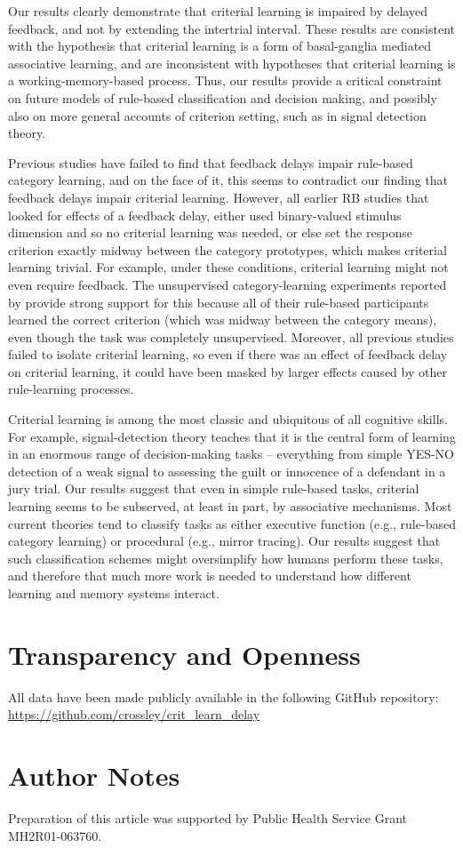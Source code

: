 \documentclass[doc, floatsintext]{apa7}
\begin{document}
Our results clearly demonstrate that criterial learning is
impaired by delayed feedback, and not by extending the
intertrial interval. These results are consistent with the
hypothesis that criterial learning is a form of
basal-ganglia mediated associative learning, and are
inconsistent with hypotheses that criterial learning is a
working-memory-based process. Thus, our results provide a
critical constraint on future models of rule-based
classification and decision making, and possibly also on
more general accounts of criterion setting, such as in
signal detection theory.

Previous studies have failed to find that feedback delays
impair rule-based category learning, and on the face of it,
this seems to contradict our finding that feedback delays
impair criterial learning. However, all earlier RB studies
that looked for effects of a feedback delay, either used
binary-valued stimulus dimension and so no criterial
learning was needed, or else set the response criterion
exactly midway between the category prototypes, which makes
criterial learning trivial. For example, under these
conditions, criterial learning might not even require
feedback. The unsupervised category-learning experiments
reported by \textcite{ashby1999dominance} provide strong
support for this because all of their rule-based
participants learned the correct criterion (which was midway
between the category means), even though the task was
completely unsupervised. Moreover, all previous studies
failed to isolate criterial learning, so even if there was
an effect of feedback delay on criterial learning, it could
have been masked by larger effects caused by other
rule-learning processes.

Criterial learning is among the most classic and ubiquitous
of all cognitive skills. For example, signal-detection
theory teaches that it is the central form of learning in an
enormous range of decision-making tasks -- everything from
simple YES-NO detection of a weak signal to assessing the
guilt or innocence of a defendant in a jury trial. Our
results suggest that even in simple rule-based tasks,
criterial learning seems to be subserved, at least in part,
by associative mechanisms. Most current theories tend to
classify tasks as either executive function (e.g.,
rule-based category learning) or procedural (e.g., mirror
tracing). Our results suggest that such classification
schemes might oversimplify how humans perform these tasks,
and therefore that much more work is needed to understand
how different learning and memory systems interact.

\section{Transparency and Openness}
All data have been made publicly available in the following
GitHub repository:
\url{https://github.com/crossley/crit_learn_delay}

\section{Author Notes}
Preparation of this article was supported by Public Health
Service Grant MH2R01-063760.

\printbibliography
\end{document}
